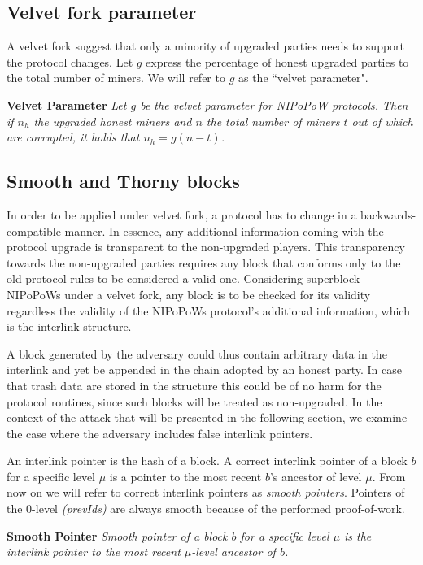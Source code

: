 \subsection{Velvet fork parameter}
A velvet fork suggest that only a minority of upgraded parties needs to support the protocol changes. Let $g$ express the percentage of honest upgraded parties to the total number of miners. We will refer to $g$ as the ``velvet parameter".

\begin{defn}{\textbf{Velvet Parameter}}
	\textit{Let $g$ be the velvet parameter for NIPoPoW protocols.  Then if $n_h$ the upgraded honest miners and $n$ the total number of miners $t$ out of which are corrupted, it holds that $n_h = g (n - t)$.}
	\label{defn:velvet_honest_majority}
\end{defn}

\subsection{Smooth and Thorny blocks}
In order to be applied under velvet fork, a protocol has to change in a
backwards-compatible manner. In essence, any additional information coming
with the protocol upgrade is transparent to the non-upgraded players. This
transparency towards the non-upgraded parties requires any block that conforms
only to the old protocol rules to be considered a valid one. Considering superblock NIPoPoWs under a velvet fork, any block is to be checked for its validity
regardless the validity of the NIPoPoWs protocol's additional information,
which is the interlink structure.

A block generated by the adversary could thus contain arbitrary data in the interlink
and yet be appended in the chain adopted by an honest party. In case that trash
data are stored in the structure this could be of no harm for the protocol routines,
since such blocks will be treated as non-upgraded. In the context of the attack
that will be presented in the following section, we examine the case where the
adversary includes false interlink pointers. 

An interlink pointer is the hash of a block. A correct interlink pointer of a block $b$
for a specific level $\mu$ is a pointer to the most recent $b$'s ancestor of level
$\mu$. From now on we will refer to correct interlink pointers as \emph{smooth pointers}.
Pointers of the 0-level \textit{(prevIds)} are always smooth because of the
performed proof-of-work.

\begin{defn}{\textbf{Smooth Pointer}}
    \textit{Smooth pointer of a block $b$ for a specific level $\mu$ is the
    interlink pointer to the most recent $\mu$-level ancestor of $b$.}
	\label{defn:smooth_pointer}
\end{defn}


